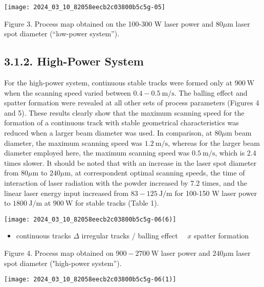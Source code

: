 \documentclass[10pt]{article}
\begin{document}
\begin{center}
\texttt{[image: 2024\_03\_10\_82058eecb2c03800b5c5g-05]}
\end{center}

Figure 3. Process map obtained on the 100-300 W laser power and $80 \mu \mathrm{m}$ laser spot diameter (“low-power system”).

\subsection*{3.1.2. High-Power System}
For the high-power system, continuous stable tracks were formed only at $900 \mathrm{~W}$ when the scanning speed varied between $0.4-0.5 \mathrm{~m} / \mathrm{s}$. The balling effect and spatter formation were revealed at all other sets of process parameters (Figures 4 and 5). These results clearly show that the maximum scanning speed for the formation of a continuous track with stable geometrical characteristics was reduced when a larger beam diameter was used. In comparison, at $80 \mu \mathrm{m}$ beam diameter, the maximum scanning speed was $1.2 \mathrm{~m} / \mathrm{s}$, whereas for the larger beam diameter employed here, the maximum scanning speed was $0.5 \mathrm{~m} / \mathrm{s}$, which is 2.4 times slower. It should be noted that with an increase in the laser spot diameter from $80 \mu \mathrm{m}$ to $240 \mu \mathrm{m}$, at correspondent optimal scanning speeds, the time of interaction of laser radiation with the powder increased by 7.2 times, and the linear laser energy input increased from $83-125 \mathrm{~J} / \mathrm{m}$ for 100-150 W laser power to $1800 \mathrm{~J} / \mathrm{m}$ at $900 \mathrm{~W}$ for stable tracks (Table 1).

\begin{center}
\texttt{[image: 2024\_03\_10\_82058eecb2c03800b5c5g-06(6)]}
\end{center}

\begin{itemize}
  \item continuous tracks $\Delta$ irregular tracks / balling effect $\quad x$ spatter formation
\end{itemize}

Figure 4. Process map obtained on $900-2700 \mathrm{~W}$ laser power and $240 \mu \mathrm{m}$ laser spot diameter ("high-power system”).

\begin{center}
\texttt{[image: 2024\_03\_10\_82058eecb2c03800b5c5g-06(1)]}
\end{center}
\end{document}
